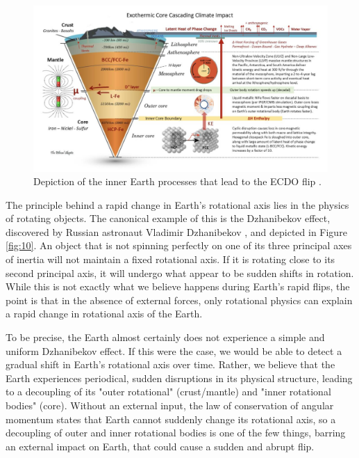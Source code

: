 \documentclass[10pt,twocolumn,letterpaper]{article}
\begin{document}
\begin{figure}[b]
\begin{center}
\includegraphics[width=1\textwidth]{layers.jpg}
\end{center}
   \caption{Depiction of the inner Earth processes that lead to the ECDO flip \cite{129}.}
\label{fig:11}
\end{figure}

The principle behind a rapid change in Earth's rotational axis lies in the physics of rotating objects. The canonical example of this is the Dzhanibekov effect, discovered by Russian astronaut Vladimir Dzhanibekov \cite{37}, and depicted in Figure \ref{fig:10}. An object that is not spinning perfectly on one of its three principal axes of inertia will not maintain a fixed rotational axis. If it is rotating close to its second principal axis, it will undergo what appear to be sudden shifts in rotation. While this is not exactly what we believe happens during Earth's rapid flips, the point is that in the absence of external forces, only rotational physics can explain a rapid change in rotational axis of the Earth.

To be precise, the Earth almost certainly does not experience a simple and uniform Dzhanibekov effect. If this were the case, we would be able to detect a gradual shift in Earth's rotational axis over time. Rather, we believe that the Earth experiences periodical, sudden disruptions in its physical structure, leading to a decoupling of its "outer rotational" (crust/mantle) and "inner rotational bodies" (core). Without an external input, the law of conservation of angular momentum states that Earth cannot suddenly change its rotational axis, so a decoupling of outer and inner rotational bodies is one of the few things, barring an external impact on Earth, that could cause a sudden and abrupt flip.
\end{document}
